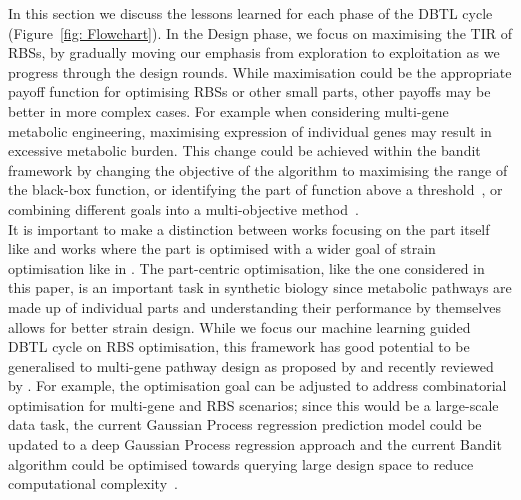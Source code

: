\documentclass{article}
\begin{document}
In this section we discuss the lessons learned for each phase of the
DBTL cycle (Figure~\ref{fig: Flowchart}).
In the Design phase, we focus on maximising the TIR of RBSs, by gradually moving our emphasis from exploration to exploitation as we progress through the design rounds.
While maximisation could be the appropriate payoff function for optimising RBSs
or other small parts, other payoffs may be better in more complex cases.
For example when considering multi-gene metabolic engineering, maximising expression of individual genes may result in excessive metabolic burden.
This change could be achieved within the bandit framework by changing the objective of the algorithm to maximising the range of the black-box function, or identifying the part of function above a threshold~\cite{gotovos2013active}, or combining different goals into a multi-objective method~\cite{shu2020new}.\\

It is important to make a distinction between works focusing on the part itself like \textcite{Hollerer2020} and works where the part is optimised with a wider goal of strain optimisation like in \textcite{Jervis2019}.
The part-centric optimisation, like the one considered in this paper, is an important task in synthetic biology since metabolic pathways are made up of individual parts and understanding their performance by themselves allows for better strain design.
While we focus our machine learning guided DBTL cycle on RBS optimisation,
this framework has good potential to be generalised to multi-gene pathway
design as proposed by \textcite{hamedirad2019towards} and recently reviewed by \textcite{LAWSON2021}.
For example, the optimisation goal can be adjusted to address combinatorial optimisation for multi-gene and RBS scenarios; since this would be a large-scale data task, the current Gaussian Process regression prediction model could be updated to a deep Gaussian Process regression approach and the current Bandit algorithm could be optimised towards querying large design space to reduce computational complexity~\cite{Shahriari2016}.
\\
\end{document}
